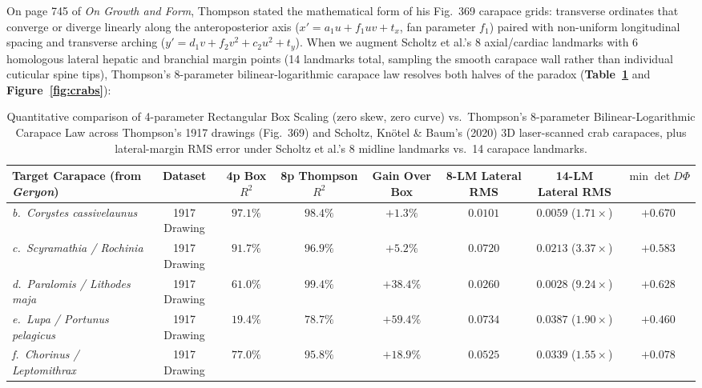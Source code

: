 \documentclass[10pt,twocolumn]{article}
\begin{document}
On page 745 of \emph{On Growth and Form}, Thompson stated the mathematical form of his Fig.~369 carapace grids: transverse ordinates that converge or diverge linearly along the anteroposterior axis ($x' = a_1 u + f_1 u v + t_x$, fan parameter $f_1$) paired with non-uniform longitudinal spacing and transverse arching ($y' = d_1 v + f_2 v^2 + c_2 u^2 + t_y$). When we augment Scholtz et al.'s 8 axial/cardiac landmarks with 6 homologous lateral hepatic and branchial margin points (14 landmarks total, sampling the smooth carapace wall rather than individual cuticular spine tips), Thompson's 8-parameter bilinear-logarithmic carapace law resolves both halves of the paradox (\textbf{Table~\ref{tab:crabs}} and \textbf{Figure~\ref{fig:crabs}}):

\begin{table}[t!]
\centering
\small
\caption{Quantitative comparison of 4-parameter Rectangular Box Scaling (zero skew, zero curve) vs.\ Thompson's 8-parameter Bilinear-Logarithmic Carapace Law across Thompson's 1917 drawings (Fig.~369) and Scholtz, Kn\"otel \& Baum's (2020) 3D laser-scanned crab carapaces, plus lateral-margin RMS error under Scholtz et al.'s 8 midline landmarks vs.\ 14 carapace landmarks.}
\label{tab:crabs}
\begin{tabular}{lccccccc}
\toprule
\textbf{Target Carapace (from \emph{Geryon})} & \textbf{Dataset} & \textbf{4p Box $R^2$} & \textbf{8p Thompson $R^2$} & \textbf{Gain Over Box} & \textbf{8-LM Lateral RMS} & \textbf{14-LM Lateral RMS} & \textbf{$\min \det D\Phi$} \\
\midrule
\emph{b.\ Corystes cassivelaunus} & 1917 Drawing & $97.1\%$ & $\mathbf{98.4\%}$ & $+1.3\%$ & $0.0101$ & $\mathbf{0.0059}$ ($1.71\times$) & $+0.670$ \\
\emph{c.\ Scyramathia / Rochinia} & 1917 Drawing & $91.7\%$ & $\mathbf{96.9\%}$ & $+5.2\%$ & $0.0720$ & $\mathbf{0.0213}$ ($3.37\times$) & $+0.583$ \\
\emph{d.\ Paralomis / Lithodes maja} & 1917 Drawing & $61.0\%$ & $\mathbf{99.4\%}$ & $\mathbf{+38.4\%}$ & $0.0260$ & $\mathbf{0.0028}$ ($9.24\times$) & $+0.628$ \\
\emph{e.\ Lupa / Portunus pelagicus} & 1917 Drawing & $19.4\%$ & $\mathbf{78.7\%}$ & $\mathbf{+59.4\%}$ & $0.0734$ & $\mathbf{0.0387}$ ($1.90\times$) & $+0.460$ \\
\emph{f.\ Chorinus / Leptomithrax} & 1917 Drawing & $77.0\%$ & $\mathbf{95.8\%}$ & $\mathbf{+18.9\%}$ & $0.0525$ & $\mathbf{0.0339}$ ($1.55\times$) & $+0.078$ \\

\end{tabular}
\end{table}
\end{document}
